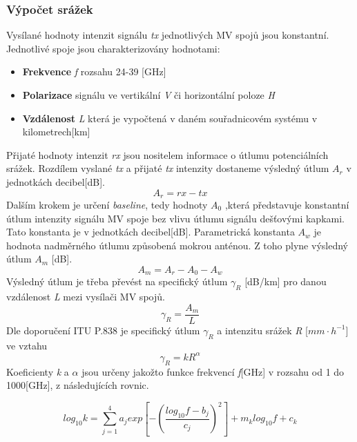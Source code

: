 \documentclass[a4paper,12pt]{article}
\begin{document}
\subsubsection{Výpočet srážek}
Vysílané hodnoty intenzit signálu \emph{tx} jednotlivých MV spojů jsou konstantní. Jednotlivé spoje jsou charakterizovány hodnotami:
\begin{itemize}
\item \textbf{Frekvence} \emph{f} rozsahu 24-39 [GHz]
\item \textbf{Polarizace} signálu ve vertikální \emph{V} či horizontální poloze \emph{H}
\item \textbf{Vzdálenost} \emph{L} která je vypočtená v daném souřadnicovém systému v kilometrech[km]
\end{itemize}
Přijaté hodnoty intenzit \emph{rx} jsou nositelem informace o útlumu potenciálních srážek. Rozdílem vyslané \emph{tx} a přijaté \emph{tx} intenzity dostaneme výsledný útlum \emph{$A_{r}$} v jednotkách decibel[dB].
\begin{equation}
 A_{r}=rx-tx
\end{equation}
Dalším krokem je určení \emph{baseline}, tedy hodnoty \emph{ $A_{0}$ }  ,která představuje konstantní útlum intenzity signálu MV spoje bez vlivu útlumu signálu dešťovými kapkami. Tato konstanta je v jednotkách decibel[dB]. Parametrická konstanta  \emph{$A_{w}$ } je hodnota nadměrného útlumu způsobená mokrou anténou. Z toho plyne výsledný útlum \emph{$A_{m}$ }[dB].
\begin{equation}\label{eq:Ar}
 A_{m}=A_{r}-A_{0}-A_{w}
\end{equation}
 Výsledný útlum je třeba převést na specifický útlum \emph{$\gamma_{R} $} [dB/km] pro danou vzdálenost \emph{L} mezi vysílači MV spojů. 
\begin{equation}
\gamma_{R} =\frac{A_{m}}{L}
\end{equation}
Dle doporučení ITU P.838 \cite{itu} je specifický útlum  \emph{$\gamma_{R} $} a intenzitu srážek  \emph{R} [$mm \cdot h^{-1}$] ve vztahu
\begin{equation}\label{eq:gamma}
\gamma_{R}=kR^{\alpha}
\end{equation}
Koeficienty \emph{k} a \emph{$\alpha$} jsou určeny jakožto funkce frekvencí \emph{f}[GHz] v rozsahu od 1 do 1000[GHz], z následujících rovnic.

\begin{equation}
log_{10}k=\sum_{j=1}^{4} a_{j} exp\left [ -\left ( \frac{log_{10}f-b_{j}}{c_{j}} \right )^{2} \right ]+m {_{k}}log_{10}f+c_{k}
\end{equation}
\end{document}
